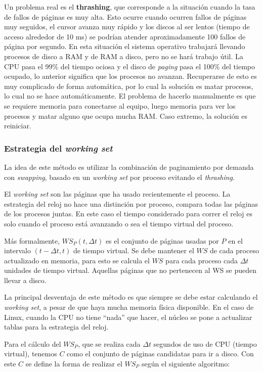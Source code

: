 Un problema real es el \textbf{thrashing}, que corresponde a la situación cuando la tasa de fallos de páginas es muy alta. Esto ocurre cuando ocurren fallos de páginas muy seguidos, el cursor avanza muy rápido y los discos al ser lentos (tiempo de acceso alrededor de 10 ms) se podrían atender aproximadamente 100 fallos de página por segundo. En esta situación el sistema operativo trabajará llevando procesos de disco a RAM y de RAM a disco, pero no se hará trabajo útil. La CPU pasa el 99\% del tiempo ociosa y el disco de \textit{paging} pasa el 100\% del tiempo ocupado, lo anterior significa que los procesos no avanzan. Recuperarse de esto es muy complicado de forma automática, por lo cual la solución es matar procesos, lo cual no se hace automáticamente. El problema de hacerlo manualmente es que se requiere memoria para conectarse al equipo, luego memoria para ver los procesos y matar alguno que ocupa mucha RAM. Caso extremo, la solución es reiniciar.

\subsubsection{Estrategia del \textit{working set}}

La idea de este método es utilizar la combinación de paginamiento por demanda con \textit{swapping}, basado en un \textit{working set} por proceso evitando el \textit{thrashing}.

El \textit{working set} son las páginas que ha usado recientemente el proceso. La estrategia del reloj no hace una distinción por proceso, compara todas las páginas de los procesos juntas. En este caso el tiempo considerado para correr el reloj es solo cuando el proceso está avanzando o sea el tiempo virtual del proceso.

Más formalmente, $WS_P(t, \Delta t)$ es el conjunto de páginas usadas por $P$ en el intervalo $(t-\Delta t, t)$ de tiempo virtual. Se debe mantener el $WS$ de cada proceso actualizado en memoria, para esto se calcula el $WS$ para cada proceso cada $\Delta t$ unidades de tiempo virtual. Aquellas páginas que no pertenecen al WS se pueden llevar a disco.

La principal desventaja de este método es que siempre se debe estar calculando el \textit{working set}, a pesar de que haya mucha memoria física disponible. En el caso de Linux, cuando la CPU no tiene ``nada'' que hacer, el núcleo se pone a actualizar tablas para la estrategia del reloj.

Para el cálculo del $WS_P$, que se realiza cada $\Delta t$ segundos de uso de CPU (tiempo virtual), tenemos $C$ como el conjunto de páginas candidatas para ir a disco. Con este $C$ se define la forma de realizar el $WS_P$ según el siguiente algoritmo:

